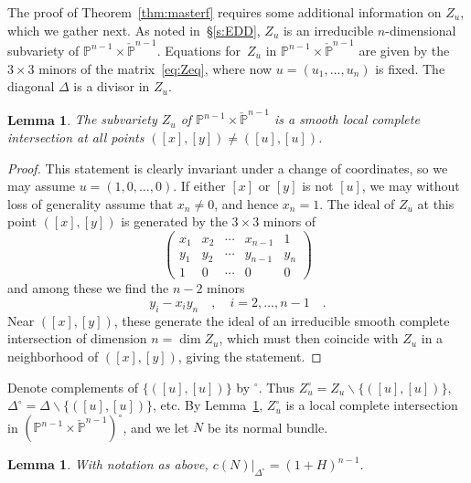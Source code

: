 \documentclass[11pt]{amsart}
\newtheorem{lemma}[theorem]{Lemma}
\numberwithin{equation}{section}
\newcommand{\Pbb}{{\mathbb{P}}}
\newcommand{\cPbb}{{\check\Pbb}}
\begin{document}
The proof of Theorem~\ref{thm:masterf} requires some additional information 
on $Z_u$, which we gather next.
As noted in~\S\ref{s:EDD}, $Z_u$ is an irreducible $n$-dimensional subvariety
of $\Pbb^{n-1}\times \cPbb^{n-1}$. Equations for~$Z_u$ in $\Pbb^{n-1}\times 
\cPbb^{n-1}$ are given by the $3\times 3$ minors of the matrix~\eqref{eq:Zeq},
where now $u=(u_1,\dots, u_n)$ is fixed. The diagonal $\Delta$ is a divisor in 
$Z_u$.

\begin{lemma}\label{lem:Zu}
The subvariety $Z_u$ of $\Pbb^{n-1}\times \cPbb^{n-1}$ is a smooth local complete 
intersection at all points $([x],[y])\ne ([u],[u])$. 
\end{lemma}

\begin{proof}
This statement is clearly invariant under a change of coordinates, so we may assume
$u=(1,0,\dots, 0)$. If either $[x]$ or $[y]$ is not $[u]$, we may without loss of generality 
assume that $x_n\ne 0$, and hence $x_n=1$. The ideal of $Z_u$ at this point 
$([x],[y])$ is generated by the $3\times 3$ minors of
\[
\begin{pmatrix}
x_1 & x_2 & \cdots & x_{n-1} & 1 \\
y_1 & y_2 & \cdots & y_{n-1} & y_n \\
1 & 0 & \cdots & 0 & 0
\end{pmatrix}
\]
and among these we find the $n-2$ minors
\[
y_i - x_i y_n\quad, \quad i = 2, \dots, n-1\quad.
\]
Near $([x],[y])$, these generate the ideal of an irreducible smooth complete 
intersection of dimension $n=\dim Z_u$, which must then coincide with $Z_u$
in a neighborhood of $([x],[y])$, giving the statement.
\end{proof}

Denote complements of $\{([u],[u])\}$ by ${}^\circ$. Thus 
$Z_u^\circ = Z_u\smallsetminus \{([u],[u])\}$, $\Delta^\circ = \Delta\smallsetminus 
\{([u],[u])\}$, etc. By Lemma~\ref{lem:Zu}, $Z_u^\circ$ is a local complete intersection 
in $(\Pbb^{n-1}\times \cPbb^{n-1})^\circ$, and we let $N$ be its normal bundle.

\begin{lemma}\label{lem:N}
With notation as above, $c(N)|_{\Delta^\circ} = (1+H)^{n-1}$.
\end{lemma}
\end{document}
